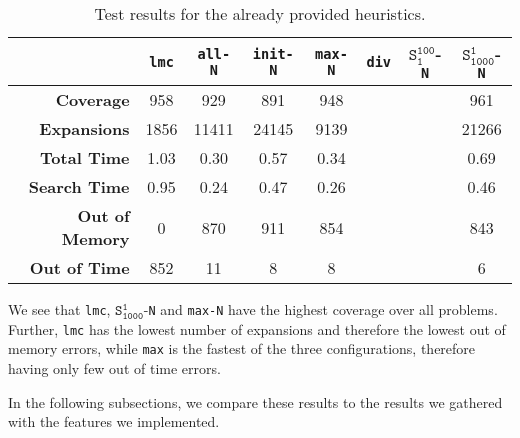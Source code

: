 \begin{table}[h!]
    \begin{center}
        \begin{tabular}{|r|c|c|c|c|c|c|c|}
            \hline
            & \textbf{\texttt{lmc}} & \textbf{\texttt{all-N}} & \textbf{\texttt{init-N}} & \textbf{\texttt{max-N}} & \textbf{\texttt{div}} & \textbf{$\texttt{S}_\texttt{1}^\texttt{100}$-\texttt{N}} & \textbf{$\texttt{S}_\texttt{1000}^\texttt{1}$-\texttt{N}} \\
            \hline \hline
            \textbf{Coverage} & 958 & 929 & 891 & 948 &  &  & 961 \\ \hline
            \textbf{Expansions} & 1856 & 11411 & 24145 & 9139 &  &  & 21266 \\ \hline
            \textbf{Total Time} & 1.03 & 0.30 & 0.57 & 0.34 &  &  & 0.69 \\ \hline
            \textbf{Search Time} & 0.95 & 0.24 & 0.47 & 0.26 &  &  & 0.46 \\ \hline
            \textbf{Out of Memory} & 0 & 870 & 911 & 854 &  &  & 843 \\ \hline
            \textbf{Out of Time} & 852 & 11 & 8 & 8 &  &  & 6 \\ \hline
        \end{tabular}
        \caption{Test results for the already provided heuristics.}
        \label{table:standard_heuristics}
    \end{center}
\end{table}

We see that \texttt{lmc}, $\texttt{S}_\texttt{1000}^\texttt{1}$-\texttt{N} and \texttt{max-N} have the highest coverage over all problems.
Further, \texttt{lmc} has the lowest number of expansions and therefore the lowest out of memory errors, while \texttt{max} is the fastest of the three configurations, therefore having only few out of time errors.

In the following subsections, we compare these results to the results we gathered with the features we implemented.


